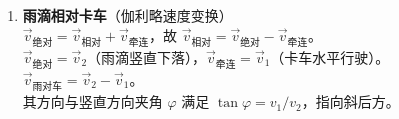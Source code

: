 \documentclass[12pt]{article}
\begin{document}
\begin{enumerate}[label=\textbf{例\arabic*.}, leftmargin=*]
\item \textbf{雨滴相对卡车}（伽利略速度变换）\\
$\vec{v}_{绝对} = \vec{v}_{相对} + \vec{v}_{牵连}$，故 $\vec{v}_{相对} = \vec{v}_{绝对} - \vec{v}_{牵连}$。\\
$\vec{v}_{绝对} = \vec{v}_2$（雨滴竖直下落），$\vec{v}_{牵连} = \vec{v}_1$（卡车水平行驶）。\\
$\vec{v}_{\text{雨对车}} = \vec{v}_2 - \vec{v}_1$。\\
其方向与竖直方向夹角 $\varphi$ 满足 $\tan\varphi = v_1/v_2$，指向斜后方。

\end{enumerate}
\end{document}
